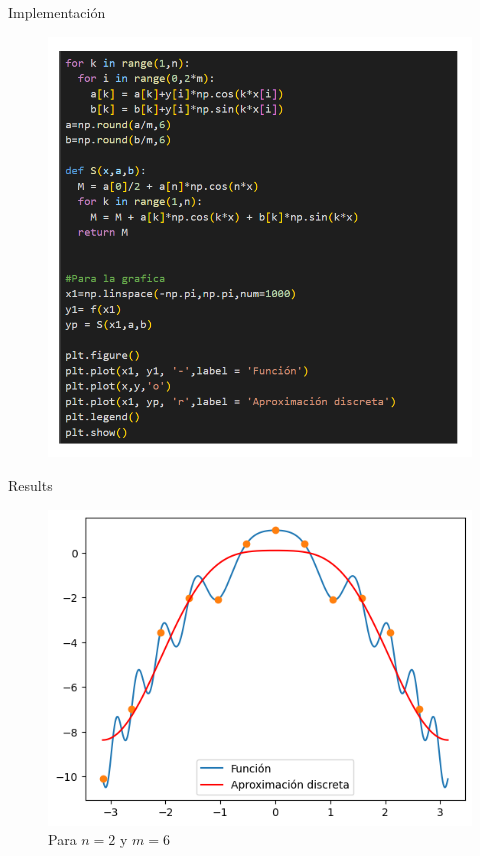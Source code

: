 \begin{frame}{Implementación}
    \begin{figure}
        \centering
        \includegraphics[width=.5\paperwidth]{p7-code2.png}
        \caption{}
        \label{fig:enter-label}
    \end{figure}
\end{frame}
\begin{frame}{Results}
    \begin{figure}
        \centering
        \includegraphics[width=.5\paperwidth]{p7-Aprox-discreta.png}
        \caption{Para $n=2$ y $m=6$}
        \label{fig:enter-label}
    \end{figure}
\end{frame}

